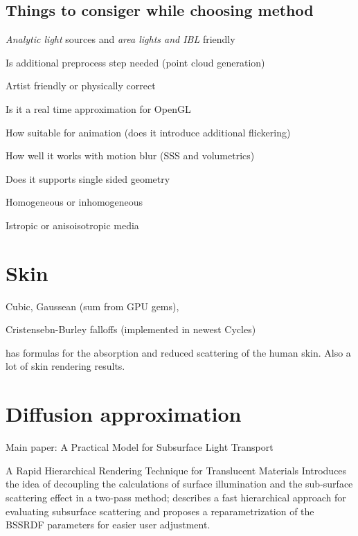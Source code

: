 \subsection{Things to consiger while choosing method}
\begin{description}
  \item [Lighting restrictions] \emph{Analytic light} sources and \emph{area lights and IBL} friendly
  \item [Multiple object friendly]
  \item [Preprocess] Is additional preprocess step needed (point cloud generation)
  \item [Parametrization] Artist friendly or physically correct
  \item [Performance] Is it a real time approximation for OpenGL
  \item [Flickering] How suitable for animation (does it introduce additional flickering)
  \item [Motion blur] How well it works with motion blur (SSS and volumetrics)
  \item [Closed objecs only] Does it supports single sided geometry
  \item Homogeneous or inhomogeneous
  \item Istropic or anisoisotropic media
\end{description}


\section{Skin}

Cubic, Gaussean (sum from GPU gems),

Cristensebn-Burley falloffs (implemented in newest Cycles)

\cite{EGWR:EGSR06:409-417} has formulas for the absorption and reduced scattering of the human skin. Also a lot of skin rendering results.

\section{Diffusion approximation}
Main paper: A Practical Model for Subsurface Light Transport

A Rapid Hierarchical Rendering Technique for Translucent Materials
Introduces the idea of decoupling the calculations of surface illumination and the sub-surface scattering effect in a two-pass method; describes a fast hierarchical approach for evaluating subsurface scattering and proposes a reparametrization of the BSSRDF parameters for easier user adjustment.

